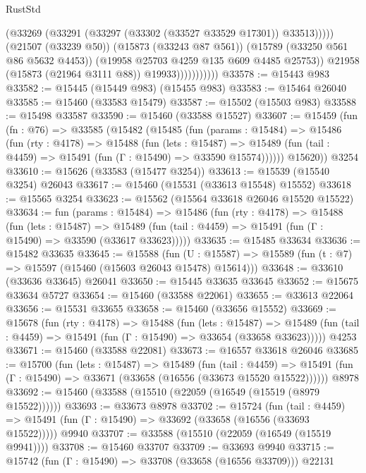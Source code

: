\begin{lexlean}{RustStd}
\begin{coremodule}
                                (@33269 (@33291 (@33297 (@33302 (@33527 @33529 @17301)) @33513)))))
                            (@21507 (@33239 @50))
                            (@15873 (@33243 @87 @561))
                            (@15789 (@33250 @561 @86 @5632 @4453))
                            (@19958 @25703 @4259 @135 @609 @4485 @25753))
                          @21958
                          (@15873 (@21964 @3111 @88))
                          @19933)))))))))))
@33578 := @15443 @983
@33582 := @15445 (@15449 @983) (@15455 @983)
@33583 := @15464 @26040
@33585 := @15460 (@33583 @15479)
@33587 := @15502 (@15503 @983)
@33588 := @15498 @33587
@33590 := @15460 (@33588 @15527)
@33607 := @15459
    (fun (fn : @76) =>
    @33585
      (@15482
        (@15485
          (fun (params : @15484) =>
          @15486
            (fun (rty : @4178) =>
            @15488
              (fun (lets : @15487) =>
              @15489 (fun (tail : @4459) => @15491 (fun (Γ : @15490) => @33590 @15574))))))
        @15620))
    @3254
@33610 := @15626 (@33583 (@15477 @3254))
@33613 := @15539 (@15540 @3254) @26043
@33617 := @15460 (@15531 (@33613 @15548) @15552)
@33618 := @15565 @3254
@33623 := @15562 (@15564 @33618 @26046 @15520 @15522)
@33634 := fun (params : @15484) =>
  @15486
    (fun (rty : @4178) =>
    @15488
      (fun (lets : @15487) =>
      @15489 (fun (tail : @4459) => @15491 (fun (Γ : @15490) => @33590 (@33617 @33623)))))
@33635 := @15485 @33634
@33636 := @15482 @33635
@33645 := @15588
    (fun (U : @15587) => @15589 (fun (t : @7) => @15597 (@15460 (@15603 @26043 @15478) @15614)))
@33648 := @33610 (@33636 @33645) @26041
@33650 := @15445 @33635 @33645
@33652 := @15675 @33634 @5727
@33654 := @15460 (@33588 @22061)
@33655 := @33613 @22064
@33656 := @15531 @33655
@33658 := @15460 (@33656 @15552)
@33669 := @15678
    (fun (rty : @4178) =>
    @15488
      (fun (lets : @15487) =>
      @15489 (fun (tail : @4459) => @15491 (fun (Γ : @15490) => @33654 (@33658 @33623)))))
    @4253
@33671 := @15460 (@33588 @22081)
@33673 := @16557 @33618 @26046
@33685 := @15700
    (fun (lets : @15487) =>
    @15489
      (fun (tail : @4459) =>
      @15491 (fun (Γ : @15490) => @33671 (@33658 (@16556 (@33673 @15520 @15522))))))
    @8978
@33692 := @15460 (@33588 (@15510 (@22059 (@16549 (@15519 (@8979 @15522))))))
@33693 := @33673 @8978
@33702 := @15724
    (fun (tail : @4459) => @15491 (fun (Γ : @15490) => @33692 (@33658 (@16556 (@33693 @15522)))))
    @9940
@33707 := @33588 (@15510 (@22059 (@16549 (@15519 @9941))))
@33708 := @15460 @33707
@33709 := @33693 @9940
@33715 := @15742 (fun (Γ : @15490) => @33708 (@33658 (@16556 @33709))) @22131

\end{coremodule}
\end{lexlean}
